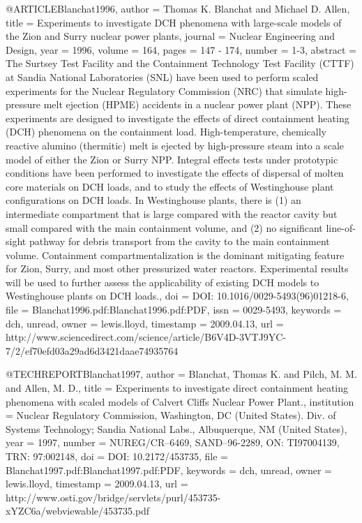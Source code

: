 @ARTICLE{Blanchat1996,
  author = {Thomas K. Blanchat and Michael D. Allen},
  title = {Experiments to investigate DCH phenomena with large-scale models
	of the Zion and Surry nuclear power plants},
  journal = {Nuclear Engineering and Design},
  year = {1996},
  volume = {164},
  pages = {147 - 174},
  number = {1-3},
  abstract = {The Surtsey Test Facility and the Containment Technology Test Facility
	(CTTF) at Sandia National Laboratories (SNL) have been used to perform
	scaled experiments for the Nuclear Regulatory Commission (NRC) that
	simulate high-pressure melt ejection (HPME) accidents in a nuclear
	power plant (NPP). These experiments are designed to investigate
	the effects of direct containment heating (DCH) phenomena on the
	containment load. High-temperature, chemically reactive alumino (thermitic)
	melt is ejected by high-pressure steam into a scale model of either
	the Zion or Surry NPP. Integral effects tests under prototypic conditions
	have been performed to investigate the effects of dispersal of molten
	core materials on DCH loads, and to study the effects of Westinghouse
	plant configurations on DCH loads. In Westinghouse plants, there
	is (1) an intermediate compartment that is large compared with the
	reactor cavity but small compared with the main containment volume,
	and (2) no significant line-of-sight pathway for debris transport
	from the cavity to the main containment volume. Containment compartmentalization
	is the dominant mitigating feature for Zion, Surry, and most other
	pressurized water reactors. Experimental results will be used to
	further assess the applicability of existing DCH models to Westinghouse
	plants on DCH loads.},
  doi = {DOI: 10.1016/0029-5493(96)01218-6},
  file = {Blanchat1996.pdf:Blanchat1996.pdf:PDF},
  issn = {0029-5493},
  keywords = {dch, unread},
  owner = {lewis.lloyd},
  timestamp = {2009.04.13},
  url = {http://www.sciencedirect.com/science/article/B6V4D-3VTJ9YC-7/2/ef70efd03a29ad6d3421daae74935764}
}

@TECHREPORT{Blanchat1997,
  author = {Blanchat, Thomas K. and Pilch, M. M. and Allen, M. D.},
  title = {Experiments to investigate direct containment heating phenomena with
	scaled models of Calvert Cliffs Nuclear Power Plant.},
  institution = {Nuclear Regulatory Commission, Washington, DC (United States). Div.
	of Systems Technology; Sandia National Labs., Albuquerque, NM (United
	States)},
  year = {1997},
  number = {NUREG/CR--6469, SAND--96-2289, ON: TI97004139, TRN: 97:002148},
  doi = {DOI: 10.2172/453735},
  file = {Blanchat1997.pdf:Blanchat1997.pdf:PDF},
  keywords = {dch, unread},
  owner = {lewis.lloyd},
  timestamp = {2009.04.13},
  url = {http://www.osti.gov/bridge/servlets/purl/453735-xYZC6a/webviewable/453735.pdf}
}

